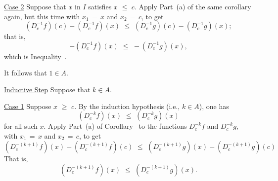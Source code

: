 {        \underline{Case 2} Suppose that $x$ in $I$ satisfies $x\,\,{\leq}\,\,c$.
    Apply Part~(a) of the same corollary again, but this time with $x_{1} \,=\, x$ and $x_{2} \,=\, c$, to get
        \begin{displaymath}
        \left(D^{-1}_{c} f\right)(c) - \left(D^{-1}_{c} f\right)(x)\,\,{\leq}\,\,
    \left(D^{-1}_{c} g\right)(c) - \left(D^{-1}_{c} g\right)(x);
        \end{displaymath}
    that is,
        \begin{displaymath}
        - \left(D^{-1}_{c} f\right)(x)\,\,{\leq}\,\,
        - \left(D^{-1}_{c} g\right)(x),
        \end{displaymath}
    which is Inequality~.

        It follows that $1{\in}A$.

\V

        \underline{Inductive Step} Suppose that $k{\in}A$.

        \underline{Case 1} Suppose $x\,\,{\geq}\,\,c$. By the induction hypothesis (i.e., $k{\in}A$), one has
        \begin{displaymath}
        \left(D^{-k}_{c} f\right)(x)\,\,{\leq}\,\,\left(D^{-k}_{c} g\right)(x)
        \end{displaymath}
    for all such $x$.
    Apply Part~(a) of Corollary~ to the functions $D^{-k}_{c} f$ and $D^{-k}_{c} g$, with $x_{1} \,=\, x$ and $x_{2} \,=\, c$, to get
        \begin{displaymath}
        \left(D^{-(k+1)}_{c} f\right)(x) - \left(D^{-(k+1)}_{c} f\right)(c) 
    \,\,{\leq}\,\,
        \left(D^{-(k+1)}_{c} g\right)(x) - \left(D^{-(k+1)}_{c} g\right)(c) 
        \end{displaymath}
    That is,
        \begin{displaymath}
        \left(D^{-(k+1)}_{c} f\right)(x) 
    \,\,{\leq}\,\,
        \left(D^{-(k+1)}_{c} g\right)(x). 
        \end{displaymath}

}
